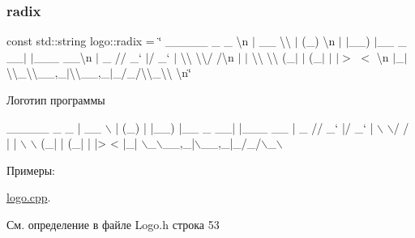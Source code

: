 \subsubsection{\texorpdfstring{radix}{radix}}
{\footnotesize\ttfamily const std\+::string logo\+::radix = \char`\"{} \+\_\+\+\_\+\+\_\+\+\_\+\+\_\+ \+\_\+ \+\_\+ \textbackslash{}n $\vert$ \+\_\+\+\_\+ \textbackslash{}\textbackslash{} $\vert$ (\+\_\+) \textbackslash{}n $\vert$ $\vert$\+\_\+\+\_\+) $\vert$\+\_\+\+\_\+ \+\_\+ \+\_\+\+\_\+$\vert$ $\vert$\+\_\+\+\_\+\+\_\+ \+\_\+\+\_\+\textbackslash{}n $\vert$ \+\_\+ // \+\_\+` $\vert$/ \+\_\+` $\vert$ \textbackslash{}\textbackslash{} \textbackslash{}\textbackslash{}/ /\textbackslash{}n $\vert$ $\vert$ \textbackslash{}\textbackslash{} \textbackslash{}\textbackslash{} (\+\_\+$\vert$ $\vert$ (\+\_\+$\vert$ $\vert$ $\vert$$>$ $<$ \textbackslash{}n $\vert$\+\_\+$\vert$ \textbackslash{}\textbackslash{}\+\_\+\textbackslash{}\textbackslash{}\+\_\+\+\_\+,\+\_\+$\vert$\textbackslash{}\textbackslash{}\+\_\+\+\_\+,\+\_\+$\vert$\+\_\+/\+\_\+/\textbackslash{}\textbackslash{}\+\_\+\textbackslash{}\textbackslash{} \textbackslash{}n\char`\"{}}

Логотип программы 
\begin{DoxyCode}
 \_\_\_\_\_           \_ \_      
|  \_\_ \(\backslash\)         | (\_)     
| |\_\_) |\_\_ \_  \_\_| |\_\_\_  \_\_
|  \_  \textcolor{comment}{// \_` |/ \_` | \(\backslash\) \(\backslash\)/ /}
| | \(\backslash\) \(\backslash\) (\_| | (\_| | |>  < 
|\_|  \(\backslash\)\_\(\backslash\)\_\_,\_|\(\backslash\)\_\_,\_|\_/\_/\(\backslash\)\_\(\backslash\)
\end{DoxyCode}
 \begin{Desc}
\item[Примеры\+: ]\par
\hyperlink{logo_8cpp-example}{logo.\+cpp}.\end{Desc}


См. определение в файле Logo.\+h строка 53

